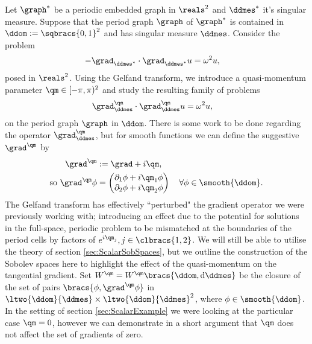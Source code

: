 Let $\graph^*$ be a periodic embedded graph in $\reals^2$ and $\ddmes^*$ it's singular measure.
Suppose that the period graph $\graph$ of $\graph^*$ is contained in $\ddom:=\sqbracs{0,1}^2$ and has singular measure $\ddmes$.
Consider the problem
\begin{align} \label{eq:WholeSpaceScalarProblem}
	-\grad_{\ddmes^*} \cdot \grad_{\ddmes^*} u &= \omega^2 u,
\end{align}
posed in $\reals^2$.
Using the Gelfand transform, we introduce a quasi-momentum parameter $\qm\in[-\pi,\pi)^2$ and study the resulting family of problems
\begin{align*}
	\grad_\ddmes^\qm \cdot \grad_\ddmes^\qm u &= \omega^2 u,
\end{align*}
on the period graph $\graph$ in $\ddom$.
There is some work to be done regarding the operator $\grad_\ddmes^\qm$, but for smooth functions we can define the suggestive $\grad^\qm$ by
\begin{align*}
	\grad^\qm &:= \grad + i\qm, \\
	\text{so } \grad^\qm \phi &= \begin{pmatrix} \partial_1\phi + i\qm_1\phi \\ \partial_2\phi + i\qm_2\phi \end{pmatrix} \quad \forall\phi\in\smooth{\ddom}.
\end{align*}
The Gelfand transform has effectively ``perturbed" the gradient operator we were previously working with; introducing an effect due to the potential for solutions in the full-space, periodic problem to be mismatched at the boundaries of the period cells by factors of $e^{i\qm_j}, j\in\clbracs{1,2}$.
We will still be able to utilise the theory of section \ref{sec:ScalarSobSpaces}, but we outline the construction of the Sobolev spaces here to highlight the effect of the quasi-momentum on the tangential gradient.
Set $W^\qm=W^\qm\bracs{\ddom,\mathrm{d}\ddmes}$ be the closure of the set of pairs $\bracs{\phi,\grad^\qm\phi}$ in $\ltwo{\ddom}{\ddmes}\times\ltwo{\ddom}{\ddmes}^2$, where $\phi\in\smooth{\ddom}$.
In the setting of section \ref{sec:ScalarExample} we were looking at the particular case $\qm=0$, however we can demonstrate in a short argument that $\qm$ does not affect the set of gradients of zero.

